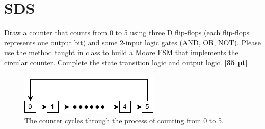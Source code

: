 \documentclass[a4paper]{article}
\begin{document}
\newpage
\section{SDS}
Draw a counter that counts from 0 to 5 using three D flip-flops (each flip-flops represents one output bit) and some 2-input logic gates (AND, OR, NOT). Please use the method taught in class to build a Moore FSM that implements the circular counter. Complete the state transition logic and output logic. \textbf{[35 pt]}
\begin{figure}[hp]
    \centering
    \includegraphics[height=2cm]{q2.png}
    \caption{The counter cycles through the process of counting from 0 to 5.}
    \label{fig:q2}
\end{figure}
\end{document}

